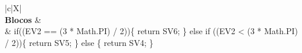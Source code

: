 \begin{xltabular}{\textwidth}{|c|X|}
 \\ \hline
\textbf{Blocos} &  \\ \hline
{} & if((EV2 == (3 * Math.PI) / 2))\{   return SV6; \} else if ((EV2 < (3 * Math.PI) / 2))\{   return SV5; \} else \{   return SV4; \} \\ \hline	


\end{xltabular}
